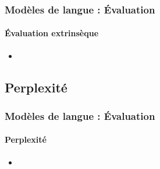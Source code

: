 \documentclass[xcolor=table]{beamer}
\begin{document}
\begin{frame}
\frametitle{Modèles de langue : Évaluation}
\framesubtitle{Évaluation extrinsèque}

\begin{itemize}
	\item 
\end{itemize}

\end{frame}

\subsection{Perplexité}

\begin{frame}
\frametitle{Modèles de langue : Évaluation}
\framesubtitle{Perplexité}

\begin{itemize}
	\item 
\end{itemize}

\end{frame}

\end{document}
